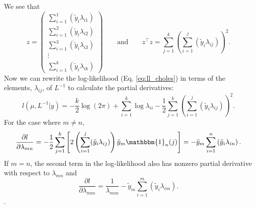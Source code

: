 \documentclass{article}
\begin{document}
%
We see that 
%
\begin{equation}
	z =
  \begin{pmatrix}
    \sum_{i=1}^1 (\tilde{y}_i \lambda_{i1}) \\
    \sum_{i=1}^2 (\tilde{y}_i \lambda_{i2}) \\
    \sum_{i=1}^3 (\tilde{y}_i \lambda_{i3}) \\
    \vdots \\
    \sum_{i=1}^k (\tilde{y}_i \lambda_{ik}) 
  \end{pmatrix}
  \qquad \text{and} \qquad
  z^\top z =
	\sum_{j=1}^k \left( \sum_{i=1}^j \left( \tilde{y}_i \lambda_{ij} \right) \right)^2.
\end{equation}
%
Now we can rewrite the log-likelihood (Eq. \ref{eq:ll_choles}) in terms of the 
elements, $\lambda_{ij}$, of $L^{-1}$ to calculate the partial derivatives:
%
\begin{equation}
	l(\mu, L^{-1}|y) = -\frac{k}{2}\log(2\pi) + \sum_{i=1}^k 
	\log{\lambda_{ii}} - \frac{1}{2} \sum_{j=1}^k 
	\left( \sum_{i=1}^j \left( \tilde{y}_i \lambda_{ij} 
	\right) \right)^2.
 \label{eq:ll_chol_terms}
\end{equation}
%
For the case where $m \neq n$, 
%
\begin{equation}
  \frac{\partial l}{\partial \lambda_{mn}} = 
  -\frac{1}{2} \sum_{j=1}^k \left[2 \left(\sum_{i=1}^j (\tilde{y}_i \lambda_{ij}) 
	\right) \tilde{y}_m \mathbbm{1}_n(j) \right] = 
  - \tilde{y}_m \sum_{i = 1}^{n} \left( \tilde{y}_i \lambda_{in} \right).	
 \label{eq:cholscore_ij}
\end{equation}
%
If $m = n$, the second term in the log-likelihood also has nonzero partial 
derivative with respect to $\lambda_{mn}$ and
%
\begin{equation}
  \frac{\partial l}{\partial \lambda_{mm}} = 
	\frac{1}{\lambda_{mm}}- \tilde{y}_m \sum_{i = 1}^{m} 
	\left( \tilde{y}_i \lambda_{im} \right).	
  \label{eq:cholscore_ii}
\end{equation}.
\end{document}
